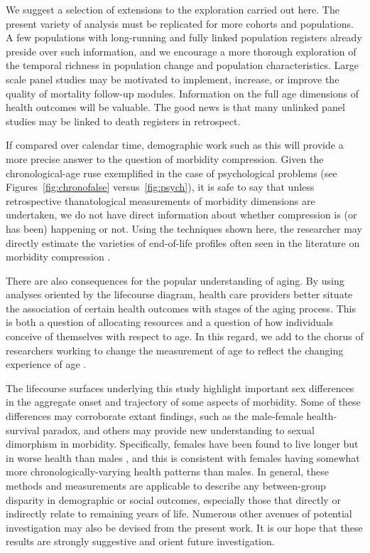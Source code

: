 \documentclass[11pt,oneside]{article} %
\begin{document}
We suggest a selection of extensions to the exploration carried out here. The
present variety of analysis must be replicated for more cohorts and populations. A few populations with long-running and fully linked population registers already preside over such information, and we encourage a
more thorough exploration of the temporal richness in population change and
population characteristics. 
Large scale panel studies may be motivated to implement, increase, or improve the quality of mortality follow-up modules. Information on the full age dimensions of health
outcomes will be valuable. The good news is that many unlinked panel studies may be linked to death registers in retrospect. 

If compared over calendar time, demographic work such as this will
provide a more precise answer to the question of morbidity compression. Given the chronological-age ruse exemplified in the case of psychological problems (see Figures~\ref{fig:chronofalse} versus~\ref{fig:psych}), it is safe to say that unless retrospective
thanatological measurements of morbidity dimensions are undertaken, we do
not have direct information about whether compression is (or has
been) happening or not. Using the techniques shown here, the researcher may
directly estimate the varieties of end-of-life profiles often seen in the
literature on morbidity compression \citep[e.g.,][]{fries2011compression}.

There are also consequences for the popular understanding of aging. By
using analyses oriented by the lifecourse diagram, health care providers better situate the association of certain health outcomes with stages of the aging process. This is both a question of allocating resources and a question of how individuals conceive of
themselves with respect to age. In this regard, we add to the chorus of
researchers working to change the measurement of age to reflect the changing
experience of age \citep[see e.g.,][]{sanderson2013characteristics}. 

The lifecourse surfaces underlying this study highlight important sex
differences in the aggregate onset and trajectory of some aspects of morbidity.
Some of these differences may corroborate extant findings, such as the
male-female health-survival paradox, and others may provide new understanding to
sexual dimorphism in morbidity. Specifically, females have been found to live
longer but in worse health than males \citep[e.g.,][]{case2005sex}, and this is
consistent with females having somewhat more chronologically-varying health
patterns than males. In general, these methods and measurements are
applicable to describe any between-group disparity in demographic or social outcomes, especially those that directly or indirectly relate to remaining years of life. Numerous other avenues of potential investigation may also be devised from the present work. It is our hope that these results are strongly suggestive and orient future investigation.
\end{document}

